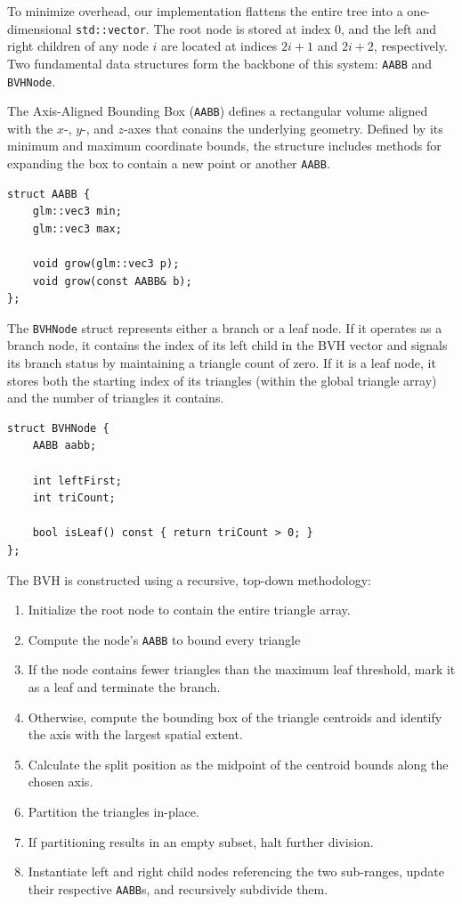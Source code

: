 \documentclass[sigconf,nonacm]{acmart}
\begin{document}
To minimize overhead, our implementation flattens the entire tree into a one-dimensional \texttt{std::vector}. The root node is stored at index $0$, and the left and right children of any node $i$ are located at indices $2i+1$ and $2i+2$, respectively. Two fundamental data structures form the backbone of this system: \texttt{AABB} and \texttt{BVHNode}.

The Axis-Aligned Bounding Box (\texttt{AABB}) defines a rectangular volume aligned with the $x$-, $y$-, and $z$-axes that conains the underlying geometry. Defined by its minimum and maximum coordinate bounds, the structure includes methods for expanding the box to contain a new point or another \texttt{AABB}.

\begin{lstlisting}[style=cppstyle]
struct AABB {
    glm::vec3 min;
    glm::vec3 max;

    void grow(glm::vec3 p);
    void grow(const AABB& b);
};
\end{lstlisting}

The \texttt{BVHNode} struct represents either a branch or a leaf node. If it operates as a branch node, it contains the index of its left child in the BVH vector and signals its branch status by maintaining a triangle count of zero. If it is a leaf node, it stores both the starting index of its triangles (within the global triangle array) and the number of triangles it contains.

\begin{lstlisting}[style=cppstyle]
struct BVHNode {
    AABB aabb;

    int leftFirst;
    int triCount;

    bool isLeaf() const { return triCount > 0; }
};
\end{lstlisting}

The BVH is constructed using a recursive, top-down methodology:
\begin{enumerate}
    \item Initialize the root node to contain the entire triangle array.
    \item Compute the node's \texttt{AABB} to bound every triangle
    \item If the node contains fewer triangles than the maximum leaf threshold, mark it as a leaf and terminate the branch.
    \item Otherwise, compute the bounding box of the triangle centroids and identify the axis with the largest spatial extent.
    \item Calculate the split position as the midpoint of the centroid bounds along the chosen axis.
    \item Partition the triangles in-place.
    \item If partitioning results in an empty subset, halt further division.
    \item Instantiate left and right child nodes referencing the two sub-ranges, update their respective \texttt{AABB}s, and recursively subdivide them.
\end{enumerate}
\end{document}
